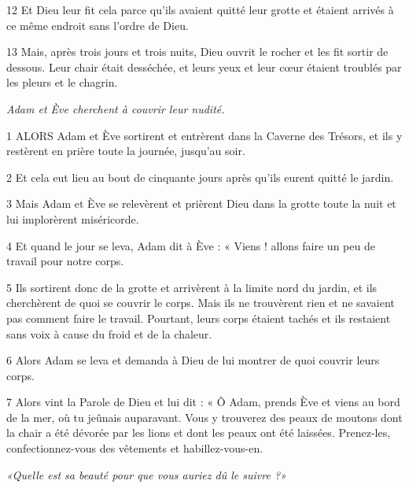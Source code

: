 \par 12 Et Dieu leur fit cela parce qu'ils avaient quitté leur grotte et étaient arrivés à ce même endroit sans l'ordre de Dieu.

\par 13 Mais, après trois jours et trois nuits, Dieu ouvrit le rocher et les fit sortir de dessous. Leur chair était desséchée, et leurs yeux et leur cœur étaient troublés par les pleurs et le chagrin.


\par \textit{Adam et Ève cherchent à couvrir leur nudité.}

\par 1 ALORS Adam et Ève sortirent et entrèrent dans la Caverne des Trésors, et ils y restèrent en prière toute la journée, jusqu'au soir.

\par 2 Et cela eut lieu au bout de cinquante jours après qu'ils eurent quitté le jardin.

\par 3 Mais Adam et Ève se relevèrent et prièrent Dieu dans la grotte toute la nuit et lui implorèrent miséricorde.

\par 4 Et quand le jour se leva, Adam dit à Ève : « Viens ! allons faire un peu de travail pour notre corps.

\par 5 Ils sortirent donc de la grotte et arrivèrent à la limite nord du jardin, et ils cherchèrent de quoi se couvrir le corps. Mais ils ne trouvèrent rien et ne savaient pas comment faire le travail. Pourtant, leurs corps étaient tachés et ils restaient sans voix à cause du froid et de la chaleur.

\par 6 Alors Adam se leva et demanda à Dieu de lui montrer de quoi couvrir leurs corps.

\par 7 Alors vint la Parole de Dieu et lui dit : « Ô Adam, prends Ève et viens au bord de la mer, où tu jeûnais auparavant. Vous y trouverez des peaux de moutons dont la chair a été dévorée par les lions et dont les peaux ont été laissées. Prenez-les, confectionnez-vous des vêtements et habillez-vous-en.


\par \textit{«Quelle est sa beauté pour que vous auriez dû le suivre ?»}

